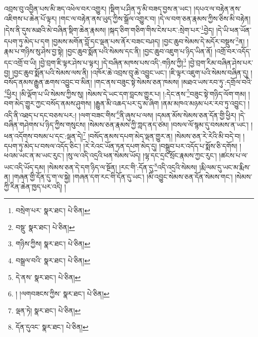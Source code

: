 འབྲས་བུ་འབྱིན་པས་མི་ཟད་འཕེལ་བར་འགྱུར། །སྡིག་པ་ཤིན་ཏུ་མི་བཟད་བྱས་ན་ཡང་། །དཔའ་ལ་བརྟེན་ནས་འཇིགས་པ་ཆེན་པོ་ལྟར། །གང་ལ་བརྟེན་ནས་ཡུད་ཀྱིས་སྒྲོལ་འགྱུར་བ། །དེ་ལ་བག་ཅན་རྣམས་ཀྱིས་ཅིས་མི་བརྟེན། །དེས་ནི་དུས་མཐའི་མེ་བཞིན་སྡིག་ཆེན་རྣམས། །སྐད་ཅིག་གཅིག་གིས་ངེས་པར་:སྲེག་པར་\footnote{བསྲེག་པར་  སྣར་ཐང་།  པེ་ཅིན། }བྱེད། །དེ་ཡི་ཕན་ཡོན་དཔག་ཏུ་མེད་པ་དག །བྱམས་མགོན་བློ་དང་ལྡན་པས་ནོར་བཟང་བཤད། །བྱང་ཆུབ་སེམས་དེ་མདོར་བསྡུས་\footnote{བསྡུ་  སྣར་ཐང་།  པེ་ཅིན། }ན། །རྣམ་པ་གཉིས་སུ་ཤེས་བྱ་སྟེ། །བྱང་ཆུབ་སྨོན་པའི་སེམས་དང་ནི། །བྱང་ཆུབ་འཇུག་པ་ཉིད་ཡིན་ནོ། །འགྲོ་བར་འདོད་དང་འགྲོ་བ་ཡི། །བྱེ་བྲག་ཇི་ལྟར་ཤེས་པ་ལྟར། །དེ་བཞིན་མཁས་པས་འདི་:གཉིས་ཀྱི།\footnote{གཉིས་ཀྱིས།  སྣར་ཐང་།  པེ་ཅིན། } །བྱེ་བྲག་རིམ་བཞིན་ཤེས་པར་བྱ། །བྱང་ཆུབ་སྨོན་པའི་སེམས་ལས་ནི། །འཁོར་ཆེ་འབྲས་བུ་ཆེ་འབྱུང་ཡང་། །ཇི་ལྟར་འཇུག་པའི་སེམས་བཞིན་དུ། །བསོད་ནམས་རྒྱུན་ཆགས་འབྱུང་བ་མིན། །གང་ནས་བཟུང་སྟེ་སེམས་ཅན་ཁམས། །མཐའ་ཡས་རབ་ཏུ་:དགྲོལ་བའི་\footnote{བསྒྲལ་བའི་  སྣར་ཐང་།  པེ་ཅིན། }ཕྱིར། །མི་ལྡོག་པ་ཡི་སེམས་ཀྱིས་སུ། །སེམས་དེ་ཡང་དག་བླངས་གྱུར་པ། །:དེང་ནས་\footnote{དེ་ནས་  སྣར་ཐང་།  པེ་ཅིན། }བཟུང་སྟེ་གཉིད་ལོག་གམ། །བག་མེད་གྱུར་ཀྱང་བསོད་ནམས་ཤུགས། །རྒྱུན་མི་འཆད་པར་དུ་མ་ཞིག །ནམ་མཁའ་མཉམ་པར་རབ་ཏུ་འབྱུང་། །འདི་ནི་འཐད་པ་དང་བཅས་པར:། །ལག་བཟང་གིས་\footnote{། །ལགབཟངས་ཀྱིས་  སྣར་ཐང་།  པེ་ཅིན། }ནི་ཞུས་པ་ལས། །དམན་མོས་སེམས་ཅན་དོན་གྱི་ཕྱིར། །དེ་བཞིན་གཤེགས་པ་ཉིད་ཀྱིས་གསུངས། །སེམས་ཅན་རྣམས་ཀྱི་ཀླད་ནད་ཙམ། །བསལ་ལོ་སྙམ་དུ་བསམས་ན་ཡང་། །ཕན་འདོགས་བསམ་པ་དང་:ལྡན་དེ།\footnote{ལྡན་ཏེ།  སྣར་ཐང་།  པེ་ཅིན། } །བསོད་ནམས་དཔག་མེད་ལྡན་གྱུར་ན། །སེམས་ཅན་རེ་རེའི་མི་བདེ་བ། །དཔག་ཏུ་མེད་པ་བསལ་འདོད་ཅིང་། །རེ་རེའང་ཡོན་ཏན་དཔག་མེད་དུ། །བསྒྲུབ་པར་འདོད་པ་སྨོས་ཅི་དགོས། །ཕའམ་ཡང་ན་མ་ཡང་རུང་། །སུ་ལ་འདི་འདྲའི་ཕན་སེམས་ཡོད། །ལྷ་དང་དྲང་སྲོང་རྣམས་ཀྱང་རུང་། །ཚངས་པ་ལ་ཡང་འདི་ཡོད་དམ། །སེམས་ཅན་དེ་དག་ཉིད་ལ་སྔོན། །རང་གི་:དོན་དུ་\footnote{དོན་དུའང་  སྣར་ཐང་།  པེ་ཅིན། }འདི་འདྲའི་སེམས། །རྨི་ལམ་དུ་ཡང་མ་རྨིས་ན། །གཞན་གྱི་དོན་དུ་ག་ལ་སྐྱེ། །གཞན་དག་རང་གི་དོན་དུ་ཡང་། །མི་འབྱུང་སེམས་ཅན་དོན་སེམས་གང་། །སེམས་ཀྱི་རིན་ཆེན་ཁྱད་པར་འདི། །
